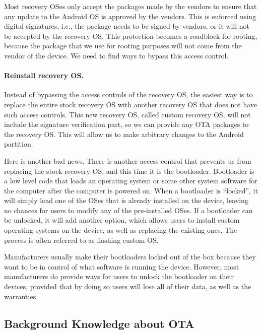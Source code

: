 Most recovery OSes only accept the packages made by the vendors to ensure
that any update to the Android OS is approved by the vendors. This is enforced
using digital signatures, i.e., the package needs to be signed by vendors,
or it will not be accepted by the recovery OS. This protection becomes a
roadblock for rooting, because the package that we use for rooting purposes
will not come from the vendor of the device. We need to find ways to bypass
this access control. 



\paragraph{Reinstall recovery OS.}
Instead of bypassing the access controls of the recovery OS, the easiest
way is to replace the entire stock recovery OS with another recovery OS
that does not have such access controls. This new recovery OS, called
custom recovery OS, will not include the signature
verification part, so we can provide any OTA packages to the recovery OS.
This will allow us to make arbitrary changes to the Android partition.

Here is another bad news. There is another access control that prevents us
from replacing the stock recovery OS, and this time it is the bootloader. 
Bootloader is a low level code that loads an operating system or some other
system software for the computer after the computer is powered on. When a
bootloader is ``locked'', it will simply load one of the OSes that is
already installed on the device, leaving no chances for users to modify any
of the pre-installed OSes. If a bootloader can be unlocked, it
will add another option, which allows users to install custom operating
systems on the device, as well as replacing the existing ones. The process
is often referred to as flashing custom OS. 

Manufacturers usually make their bootloaders locked out of
the box because they want to be in control of what software is running the
device. However, most manufacturers do provide ways for users to unlock the bootloader on their devices, 
provided that by doing so users will lose all of their data, as well as the warranties.  



\subsection{Background Knowledge about OTA}

